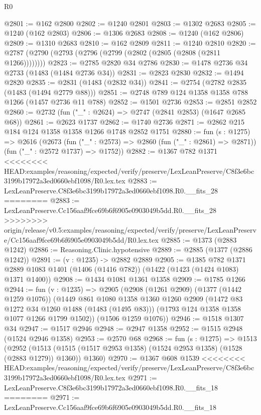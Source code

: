 \begin{lexlean}{R0}
\begin{coremodule}
{{{{{{{{{{{{{{{{{{{{{{{{{{{{{{{{{{{{{{{{{{{{{{{{{{{{{{{{{{{{{{{{{{{{{{{{{{{{{{{{{{{{{{@2801 := @162 @2800
@2802 := @1240 @2801
@2803 := @1302 @2683
@2805 := @1240 (@162 @2803)
@2806 := @1306 @2683
@2808 := @1240 (@162 @2806)
@2809 := @1310 @2683
@2810 := @162 @2809
@2811 := @1240 @2810
@2820 := @2787 (@2790 (@2793 (@2796 (@2799 (@2802 (@2805 (@2808 (@2811 @1266))))))))
@2823 := @2785 @2820 @34 @2786
@2830 := @1478 @2736 @34 @2733 (@1483 (@1484 @2736 @34))
@2831 := @2823 @2830
@2832 := @1494 @2820
@2835 := @2831 (@1483 (@2832 @34))
@2841 := @2754 (@2782 @2835 (@1483 (@1494 @2779 @88)))
@2851 := @2748 @789 @124 @1358 @1358 @788 @1266 (@1457 @2736 @11 @788)
@2852 := @1501 @2736
@2853 := @2851 @2852
@2860 := @2732 (fun ("_" : @2624) => @2747 (@2841 @2853) (@1647 @2685 @68))
@2861 := @2623 @1737
@2862 := @1740 @2736
@2871 := @2862 @215 @184 @124 @1358 @1358 @1266 @1748 @2852 @1751
@2880 := fun (s : @1275) =>
  @2616
    (@2673
      (fun ("_" : @2573) => @2860 (fun ("_" : @2861) => @2871))
      (fun ("_" : @2572 @1737) => @1752))
@2882 := @1367 @782 @1371
<<<<<<<< HEAD:examples/reasoning/expected/verify/preserve/LexLeanPreserve/C8f3e6bc3199b17972a3ed0660ebf1098/R0.lex.tex
@2883 := LexLeanPreserve.C8f3e6bc3199b17972a3ed0660ebf1098.R0.__fits_28
========
@2883 := LexLeanPreserve.Cc156aaf9fce69b6f6905e0903049b5dd.R0.__fits_28
>>>>>>>> origin/release/v0.5:examples/reasoning/expected/verify/preserve/LexLeanPreserve/Cc156aaf9fce69b6f6905e0903049b5dd/R0.lex.tex
@2885 := @1373 (@2883 @1242)
@2886 := Reasoning.Clinic.hypotensive
@2889 := @2885 (@1377 (@2886 @1242))
@2891 := (v : @1235) -> @2882 @2889
@2905 := @1385
    @782
    @1371
    @2889
    @1083
    @1401
    (@1406 (@1416 @782))
    (@1422 (@1423 (@1424 @1083) @1371 @1400))
@2908 := @1434 @1081 @1361 @1358
@2909 := @1785 @1266
@2944 := fun (v : @1235) =>
  @2905
    (@2908
      (@1261 @2909)
      (@1377 (@1442 @1259 @1076))
      (@1449
        @861
        @1080
        @1358
        @1360
        @1260
        @2909
        (@1472 @83 @1272 @34 @1260 @1488 (@1483 (@1495 @83)))
        (@1793 @124 @1358 @1358 @1077 @1266 @1799 @1502))
      (@1506 @1259 @1076))
@2946 := @1518 @1307 @34
@2947 := @1517 @2946
@2948 := @2947 @1358
@2952 := @1515 @2948 (@1524 @2946 @1358)
@2953 := @2570 @68
@2968 := fun (s : @1275) =>
  @1513
    (@2952
      (@1513 (@1515 (@1517 @2953 @1358) (@1524 @2953 @1358) (@1528 (@2883 @1279)) @1360))
      @1360)
@2970 := @1367 @608 @1539
<<<<<<<< HEAD:examples/reasoning/expected/verify/preserve/LexLeanPreserve/C8f3e6bc3199b17972a3ed0660ebf1098/R0.lex.tex
@2971 := LexLeanPreserve.C8f3e6bc3199b17972a3ed0660ebf1098.R0.__fits_18
========
@2971 := LexLeanPreserve.Cc156aaf9fce69b6f6905e0903049b5dd.R0.__fits_18
}}}}}}}}}}}}}}}}}}}}}}}}}}}}}}}}}}}}}}}}}}}}}}}}}}}}}}}}}}}}}}}}}}}}}}}}}}}}}}}}}}}}}}
\end{coremodule}
\end{lexlean}
